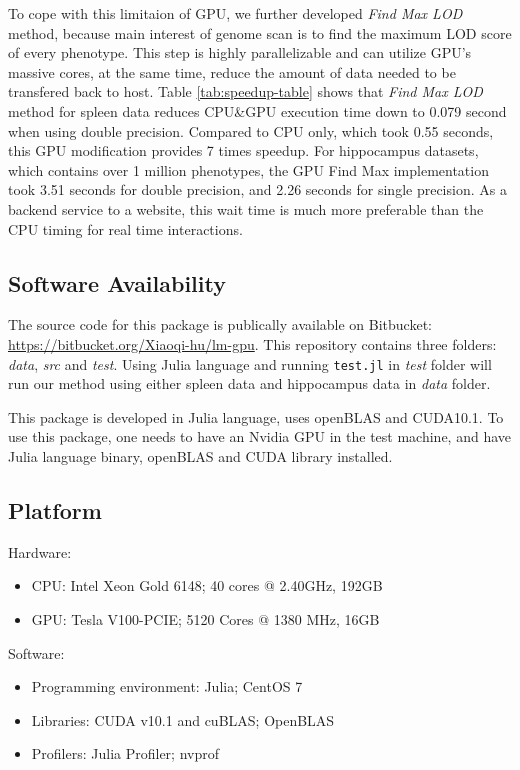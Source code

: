 \documentclass[9pt,twocolumn,twoside,lineno]{gsag3jnl}
\newcommand{\code}{\texttt}
\begin{document}
To cope with this limitaion of GPU, we further developed \textit{Find Max LOD} method, because main interest of genome scan is to find the maximum LOD score of every phenotype. 
This step is highly parallelizable and can utilize GPU's massive cores, at the same time, reduce the amount of data needed to be transfered back to host. 
Table \ref{tab:speedup-table} shows that \textit{Find Max LOD} method for spleen data reduces CPU\&GPU execution time down to 0.079 second when using double precision. 
Compared to CPU only, which took 0.55 seconds, this GPU modification provides 7 times speedup. 
For hippocampus datasets, which contains over 1 million phenotypes, the GPU Find Max implementation took 3.51 seconds for double precision, and 2.26 seconds for single precision. 
As a backend service to a website, this wait time is much more preferable than the CPU timing for real time interactions. 

\subsection{Software Availability}
The source code for this package is publically available on Bitbucket: \url{https://bitbucket.org/Xiaoqi-hu/lm-gpu}.
This repository contains three folders: \textit{data}, \textit{src} and \textit{test}. 
Using Julia language and running \code{test.jl} in \textit{test} folder will run our method using either spleen data and hippocampus data in \textit{data} folder. 

This package is developed in Julia language, uses openBLAS and CUDA10.1. 
To use this package, one needs to have an Nvidia GPU in the test machine,
and have Julia language binary, openBLAS and CUDA library installed. 

\subsection{Platform}
Hardware:
 \begin{itemize}
	\item CPU: Intel Xeon Gold 6148; 40 cores @ 2.40GHz, 192GB 
	\item GPU: Tesla V100-PCIE; 5120 Cores @ 1380 MHz, 16GB
\end{itemize}
Software: 
\begin{itemize}
	\item Programming environment: Julia; CentOS 7
	\item Libraries: CUDA v10.1 and cuBLAS; OpenBLAS
	\item Profilers: Julia Profiler; nvprof
\end{itemize}
\end{document}
